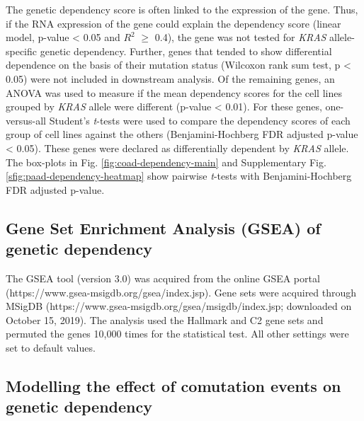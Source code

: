 \documentclass[english, 10pt, letterpaper]{article}
\newcommand{\KRAS}{\emph{KRAS}}
\begin{document}
The genetic dependency score is often linked to the expression of the gene.
Thus, if the RNA expression of the gene could explain the dependency score (linear model, p-value < 0.05 and $R^2$ $\ge$ 0.4), the gene was not tested for \KRAS{} allele-specific genetic dependency.
Further, genes that tended to show differential dependence on the basis of their mutation status (Wilcoxon rank sum test, p < 0.05) were not included in downstream analysis.
Of the remaining genes, an ANOVA was used to measure if the mean dependency scores for the cell lines grouped by \KRAS{} allele were different (p-value < 0.01).
For these genes, one-versus-all Student's \emph{t}-tests were used to compare the dependency scores of each group of cell lines against the others (Benjamini-Hochberg FDR adjusted p-value < 0.05).
These genes were declared as differentially dependent by \KRAS{} allele.
The box-plots in Fig. \ref{fig:coad-dependency-main} and Supplementary Fig. \ref{sfig:paad-dependency-heatmap} show pairwise \emph{t}-tests with Benjamini-Hochberg FDR adjusted p-value.


\subsection*{Gene Set Enrichment Analysis (GSEA) of genetic dependency}
The GSEA tool (version 3.0) was acquired from the online GSEA portal (https://www.gsea-msigdb.org/gsea/index.jsp).
Gene sets were acquired through MSigDB (https://www.gsea-msigdb.org/gsea/msigdb/index.jsp; downloaded on October 15, 2019).
The analysis used the Hallmark and C2 gene sets and permuted the genes 10,000 times for the statistical test.
All other settings were set to default values.


\subsection*{Modelling the effect of comutation events on genetic dependency}
\end{document}
